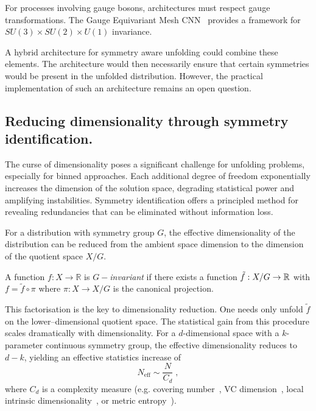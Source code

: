        For processes involving gauge bosons, architectures must respect gauge transformations.
        The Gauge Equivariant Mesh CNN~\cite{haan_gauge_2021} provides a framework for \(SU(3) \times SU(2) \times U(1)\) invariance.

        A hybrid architecture for symmetry aware unfolding could combine these elements.
        The architecture would then necessarily ensure that certain symmetries would be present in the unfolded distribution.
        However, the practical implementation of such an architecture remains an open question.
    \subsection{Reducing dimensionality through symmetry identification.}
        The curse of dimensionality poses a significant challenge for unfolding problems, especially for binned approaches.
        Each additional degree of freedom exponentially increases the dimension of the solution space, degrading statistical power and amplifying instabilities.
        Symmetry identification offers a principled method for revealing redundancies that can be eliminated without information loss.
        
        For a distribution with symmetry group \(G\), the effective dimensionality of the distribution can be reduced from the ambient space dimension to the dimension of the quotient space \(X/G\).

        \begin{definition}
        A function \(f: X \rightarrow \mathbb{R}\) is \(G-\)\emph{invariant} if there exists a function \(\tilde{f}: X/G \rightarrow \mathbb{R}\) with \(f = \tilde{f} \circ \pi\) where \(\pi: X \rightarrow X/G\) is the canonical projection.
        \end{definition}
        
        This factorisation is the key to dimensionality reduction.
        One needs only unfold \(\tilde{f}\) on the lower--dimensional quotient space.
        The statistical gain from this procedure scales dramatically with dimensionality.
        For a \(d\)-dimensional space with a \(k\)-parameter continuous symmetry group, the effective dimensionality reduces to \(d-k\), yielding an effective statistics increase of
        \[
            N_{\text{eff}} \sim \frac{N}{C_d}\;,
        \]
        where \(C_d\) is a complexity measure (e.g. covering number~\cite{shalev-shwartz_understanding_2014}, VC dimension~\cite{vapnik_uniform_1971}, local intrinsic dimensionality~\cite{tempczyk_lidl_2022}, or metric entropy~\cite{20166.1Uses}).
        
